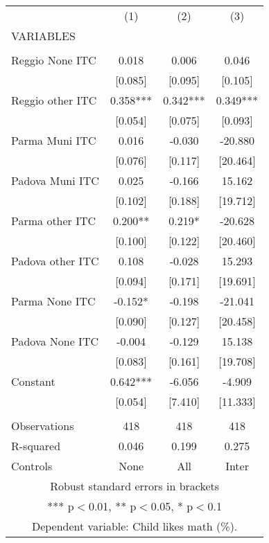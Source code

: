 \begin{tabular}{lccc} \hline
 & (1) & (2) & (3) \\
VARIABLES &  &  &  \\ \hline
 &  &  &  \\
Reggio None ITC & 0.018 & 0.006 & 0.046 \\
 & [0.085] & [0.095] & [0.105] \\
Reggio other ITC & 0.358*** & 0.342*** & 0.349*** \\
 & [0.054] & [0.075] & [0.093] \\
Parma Muni ITC & 0.016 & -0.030 & -20.880 \\
 & [0.076] & [0.117] & [20.464] \\
Padova Muni ITC & 0.025 & -0.166 & 15.162 \\
 & [0.102] & [0.188] & [19.712] \\
Parma other ITC & 0.200** & 0.219* & -20.628 \\
 & [0.100] & [0.122] & [20.460] \\
Padova other ITC & 0.108 & -0.028 & 15.293 \\
 & [0.094] & [0.171] & [19.691] \\
Parma None ITC & -0.152* & -0.198 & -21.041 \\
 & [0.090] & [0.127] & [20.458] \\
Padova None ITC & -0.004 & -0.129 & 15.138 \\
 & [0.083] & [0.161] & [19.708] \\
Constant & 0.642*** & -6.056 & -4.909 \\
 & [0.054] & [7.410] & [11.333] \\
 &  &  &  \\
Observations & 418 & 418 & 418 \\
R-squared & 0.046 & 0.199 & 0.275 \\
 Controls & None & All & Inter \\ \hline
\multicolumn{4}{c}{ Robust standard errors in brackets} \\
\multicolumn{4}{c}{ *** p$<$0.01, ** p$<$0.05, * p$<$0.1} \\
\multicolumn{4}{c}{ Dependent variable: Child likes math (\%).} \\
\end{tabular}
